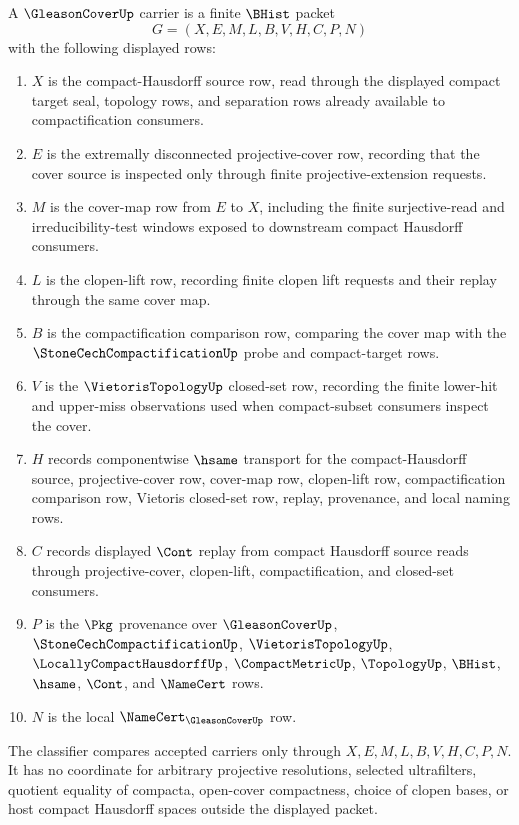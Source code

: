 \begin{definition}
\label{def:gleason-cover-carrier}
A $\GleasonCoverUp$ carrier is a finite $\BHist$ packet
$$
G=(X,E,M,L,B,V,H,C,P,N)
$$
with the following displayed rows:
\begin{enumerate}
\item $X$ is the compact-Hausdorff source row, read through the displayed compact target seal, topology rows, and separation rows already available to compactification consumers.
\item $E$ is the extremally disconnected projective-cover row, recording that the cover source is inspected only through finite projective-extension requests.
\item $M$ is the cover-map row from $E$ to $X$, including the finite surjective-read and irreducibility-test windows exposed to downstream compact Hausdorff consumers.
\item $L$ is the clopen-lift row, recording finite clopen lift requests and their replay through the same cover map.
\item $B$ is the compactification comparison row, comparing the cover map with the $\StoneCechCompactificationUp$ probe and compact-target rows.
\item $V$ is the $\VietorisTopologyUp$ closed-set row, recording the finite lower-hit and upper-miss observations used when compact-subset consumers inspect the cover.
\item $H$ records componentwise $\hsame$ transport for the compact-Hausdorff source, projective-cover row, cover-map row, clopen-lift row, compactification comparison row, Vietoris closed-set row, replay, provenance, and local naming rows.
\item $C$ records displayed $\Cont$ replay from compact Hausdorff source reads through projective-cover, clopen-lift, compactification, and closed-set consumers.
\item $P$ is the $\Pkg$ provenance over $\GleasonCoverUp$, $\StoneCechCompactificationUp$, $\VietorisTopologyUp$, $\LocallyCompactHausdorffUp$, $\CompactMetricUp$, $\TopologyUp$, $\BHist$, $\hsame$, $\Cont$, and $\NameCert$ rows.
\item $N$ is the local $\NameCert_{\GleasonCoverUp}$ row.
\end{enumerate}
The classifier compares accepted carriers only through $X,E,M,L,B,V,H,C,P,N$. It has no coordinate for arbitrary projective resolutions, selected ultrafilters, quotient equality of compacta, open-cover compactness, choice of clopen bases, or host compact Hausdorff spaces outside the displayed packet.
\end{definition}

